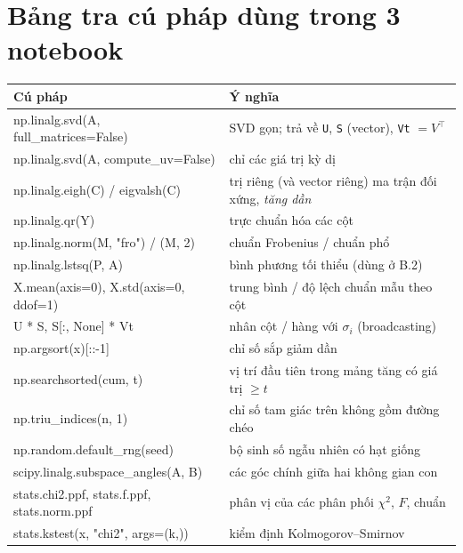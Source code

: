 \documentclass[11pt,a4paper]{article}
\newcommand{\code}[1]{\texttt{#1}}
\begin{document}
\section{Bảng tra cú pháp dùng trong 3 notebook}
\begin{center}
\renewcommand{\arraystretch}{1.15}
\begin{tabularx}{\linewidth}{@{}>{\ttfamily\raggedright}p{6.2cm}X@{}}
\toprule
\normalfont\textbf{Cú pháp} & \textbf{Ý nghĩa} \\
\midrule
np.linalg.svd(A, full\_matrices=False) & SVD gọn; trả về \code{U}, \code{S} (vector), \code{Vt} $=V^\top$ \\
np.linalg.svd(A, compute\_uv=False) & chỉ các giá trị kỳ dị \\
np.linalg.eigh(C) / eigvalsh(C) & trị riêng (và vector riêng) ma trận đối xứng, \emph{tăng dần} \\
np.linalg.qr(Y) & trực chuẩn hóa các cột \\
np.linalg.norm(M, "fro") / (M, 2) & chuẩn Frobenius / chuẩn phổ \\
np.linalg.lstsq(P, A) & bình phương tối thiểu (dùng ở B.2) \\
X.mean(axis=0), X.std(axis=0, ddof=1) & trung bình / độ lệch chuẩn mẫu theo cột \\
U * S, S[:, None] * Vt & nhân cột / hàng với $\sigma_i$ (broadcasting) \\
np.argsort(x)[::-1] & chỉ số sắp giảm dần \\
np.searchsorted(cum, t) & vị trí đầu tiên trong mảng tăng có giá trị $\ge t$ \\
np.triu\_indices(n, 1) & chỉ số tam giác trên không gồm đường chéo \\
np.random.default\_rng(seed) & bộ sinh số ngẫu nhiên có hạt giống \\
scipy.linalg.subspace\_angles(A, B) & các góc chính giữa hai không gian con \\
stats.chi2.ppf, stats.f.ppf, stats.norm.ppf & phân vị của các phân phối $\chi^2$, $F$, chuẩn \\
stats.kstest(x, "chi2", args=(k,)) & kiểm định Kolmogorov--Smirnov \\
\bottomrule
\end{tabularx}
\end{center}

\end{document}
